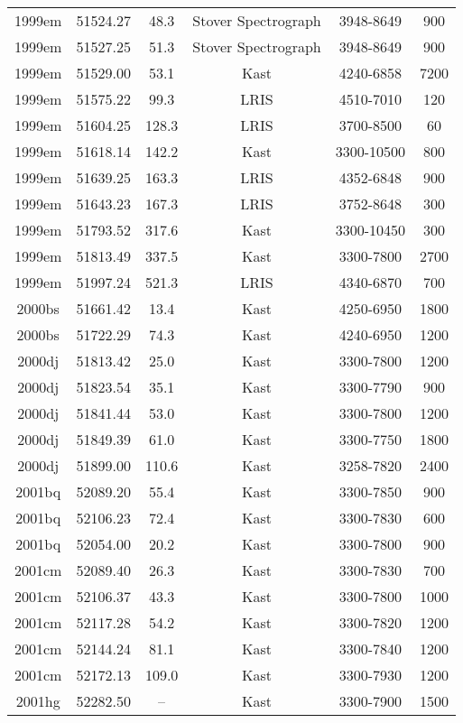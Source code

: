 \begin{table*}
\begin{tabular}{cccccc}
1999em	 & 51524.27	 &48.3	 &Stover Spectrograph	 & 3948-8649 &900 \\ 
1999em	 & 51527.25	 &51.3	 &Stover Spectrograph	 & 3948-8649 &900 \\ 
1999em	 & 51529.00	 &53.1	 &Kast	 & 4240-6858 &7200 \\ 
1999em	 & 51575.22	 &99.3	 &LRIS	 & 4510-7010 &120 \\ 
1999em	 & 51604.25	 &128.3	 &LRIS	 & 3700-8500 &60 \\ 
1999em	 & 51618.14	 &142.2	 &Kast	 & 3300-10500 &800 \\ 
1999em	 & 51639.25	 &163.3	 &LRIS	 & 4352-6848 &900 \\ 
1999em	 & 51643.23	 &167.3	 &LRIS	 & 3752-8648 &300 \\ 
1999em	 & 51793.52	 &317.6	 &Kast	 & 3300-10450 &300 \\ 
1999em	 & 51813.49	 &337.5	 &Kast	 & 3300-7800 &2700 \\ 
1999em	 & 51997.24	 &521.3	 &LRIS	 & 4340-6870 &700 \\ 
2000bs	 & 51661.42	 &13.4	 &Kast	 & 4250-6950 &1800 \\ 
2000bs	 & 51722.29	 &74.3	 &Kast	 & 4240-6950 &1200 \\ 
2000dj	 & 51813.42	 &25.0	 &Kast	 & 3300-7800 &1200 \\ 
2000dj	 & 51823.54	 &35.1	 &Kast	 & 3300-7790 &900 \\ 
2000dj	 & 51841.44	 &53.0	 &Kast	 & 3300-7800 &1200 \\ 
2000dj	 & 51849.39	 &61.0	 &Kast	 & 3300-7750 &1800 \\ 
2000dj	 & 51899.00	 &110.6	 &Kast	 & 3258-7820 &2400 \\ 
2001bq	 & 52089.20	 &55.4	 &Kast	 & 3300-7850 &900 \\ 
2001bq	 & 52106.23	 &72.4	 &Kast	 & 3300-7830 &600 \\ 
2001bq	 & 52054.00	 &20.2	 &Kast	 & 3300-7800 &900 \\ 
2001cm	 & 52089.40	 &26.3	 &Kast	 & 3300-7830 &700 \\ 
2001cm	 & 52106.37	 &43.3	 &Kast	 & 3300-7800 &1000 \\ 
2001cm	 & 52117.28	 &54.2	 &Kast	 & 3300-7820 &1200 \\ 
2001cm	 & 52144.24	 &81.1	 &Kast	 & 3300-7840 &1200 \\ 
2001cm	 & 52172.13	 &109.0	 &Kast	 & 3300-7930 &1200 \\ 
2001hg	 & 52282.50	 &--	 &Kast	 & 3300-7900 &1500 \\ 

\end{tabular}
\end{table*}
